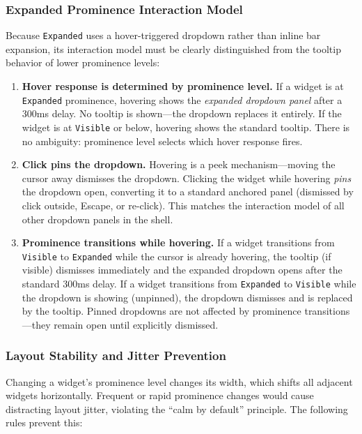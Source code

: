 \documentclass[11pt,a4paper]{article}
\begin{document}
\subsubsection{Expanded Prominence Interaction Model}

Because \texttt{Expanded} uses a hover-triggered dropdown rather than inline bar expansion, its interaction model must be clearly distinguished from the tooltip behavior of lower prominence levels:

\begin{enumerate}[leftmargin=1.5em, itemsep=3pt]
  \item \textbf{Hover response is determined by prominence level.} If a widget is at \texttt{Expanded} prominence, hovering shows the \emph{expanded dropdown panel} after a 300ms delay. No tooltip is shown---the dropdown replaces it entirely. If the widget is at \texttt{Visible} or below, hovering shows the standard tooltip. There is no ambiguity: prominence level selects which hover response fires.

  \item \textbf{Click pins the dropdown.} Hovering is a peek mechanism---moving the cursor away dismisses the dropdown. Clicking the widget while hovering \emph{pins} the dropdown open, converting it to a standard anchored panel (dismissed by click outside, Escape, or re-click). This matches the interaction model of all other dropdown panels in the shell.

  \item \textbf{Prominence transitions while hovering.} If a widget transitions from \texttt{Visible} to \texttt{Expanded} while the cursor is already hovering, the tooltip (if visible) dismisses immediately and the expanded dropdown opens after the standard 300ms delay. If a widget transitions from \texttt{Expanded} to \texttt{Visible} while the dropdown is showing (unpinned), the dropdown dismisses and is replaced by the tooltip. Pinned dropdowns are not affected by prominence transitions---they remain open until explicitly dismissed.
\end{enumerate}

\subsubsection{Layout Stability and Jitter Prevention}

Changing a widget's prominence level changes its width, which shifts all adjacent widgets horizontally. Frequent or rapid prominence changes would cause distracting layout jitter, violating the ``calm by default'' principle. The following rules prevent this:
\end{document}
